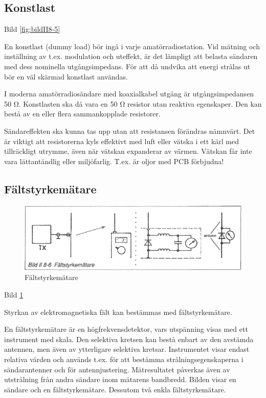 \subsection{Konstlast}

Bild \ref{fig:bildII8-5}

En konstlast (dummy load) bör ingå i varje amatörradiostation.  Vid
mätning och inställning av t.ex. modulation och uteffekt, är det
lämpligt att belasta sändaren med dess nominella utgångsimpedans.  För
att då undvika att energi strålas ut bör en väl skärmad konstlast
användas.

I moderna amatörradiosändare med koaxialkabel utgång är
utgångsimpedansen 50 Ω. Konstlasten ska då vara en 50 Ω resistor
utan reaktiva egenskaper.  Den kan bestå av en eller flera
sammankopplade resistorer.

Sändareffekten ska kunna tas upp utan att resistansen förändras
nämnvärt. Det är viktigt att resistorerna kyls effektivt med luft
eller vätska i ett kärl med tillräckligt utrymme, även när vätskan
expanderar av värmen.  Vätskan får inte vara lättantändlig eller
miljöfarlig.  T.ex. är oljor med PCB förbjudna!

\subsection{Fältstyrkemätare}

\begin{figure}
  \includegraphics[width=\textwidth]{images/bild_2_8-06}
  \caption{Fältstyrkemätare}
  \label{fig:bildII8-6}
\end{figure}

Bild \ref{fig:bildII8-6}

Styrkan av elektromagnetiska fält kan bestämmas med fältstyrkemätare.

En fältstyrkemätare är en högfrekvensdetektor, vars utspänning visas
med ett instrument med skala.  Den selektiva kretsen kan bestå enbart
av den avstämda antennen, men även av ytterligare selektiva
kretsar. Instrumentet visar endast relativa värden och används
t.ex. för att bestämma strålningsegenskaperna i sändarantenner och för
antennjustering.  Mätresultatet påverkas även av utstrålning från
andra sändare inom mätarens bandbredd.  Bilden visar en sändare och en
fältstyrkemätare.  Dessutom två enkla fältstyrkemätare.

